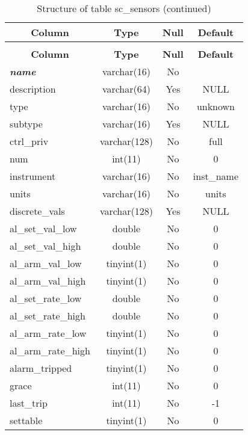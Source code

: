 %
%
 \begin{longtable}{|l|c|c|c|} 
 \caption{Structure of table sc\_sensors} \label{tab:sc_sensors-structure} \\
 \hline \multicolumn{1}{|c|}{\textbf{Column}} & \multicolumn{1}{|c|}{\textbf{Type}} & \multicolumn{1}{|c|}{\textbf{Null}} & \multicolumn{1}{|c|}{\textbf{Default}} \\ \hline \hline
\endfirsthead
 \caption{Structure of table sc\_sensors (continued)} \\ 
 \hline \multicolumn{1}{|c|}{\textbf{Column}} & \multicolumn{1}{|c|}{\textbf{Type}} & \multicolumn{1}{|c|}{\textbf{Null}} & \multicolumn{1}{|c|}{\textbf{Default}} \\ \hline \hline \endhead \endfoot 
\textbf{\textit{name}} & varchar(16) & No &  \\ \hline 
description & varchar(64) & Yes & NULL \\ \hline 
type & varchar(16) & No & unknown \\ \hline 
subtype & varchar(16) & Yes & NULL \\ \hline 
ctrl\_priv & varchar(128) & No & full \\ \hline 
num & int(11) & No & 0 \\ \hline 
instrument & varchar(16) & No & inst\_name \\ \hline 
units & varchar(16) & No & units \\ \hline 
discrete\_vals & varchar(128) & Yes & NULL \\ \hline 
al\_set\_val\_low & double & No & 0 \\ \hline 
al\_set\_val\_high & double & No & 0 \\ \hline 
al\_arm\_val\_low & tinyint(1) & No & 0 \\ \hline 
al\_arm\_val\_high & tinyint(1) & No & 0 \\ \hline 
al\_set\_rate\_low & double & No & 0 \\ \hline 
al\_set\_rate\_high & double & No & 0 \\ \hline 
al\_arm\_rate\_low & tinyint(1) & No & 0 \\ \hline 
al\_arm\_rate\_high & tinyint(1) & No & 0 \\ \hline 
alarm\_tripped & tinyint(1) & No & 0 \\ \hline 
grace & int(11) & No & 0 \\ \hline 
last\_trip & int(11) & No & -1 \\ \hline 
settable & tinyint(1) & No & 0 \\ \hline 

\end{longtable}
